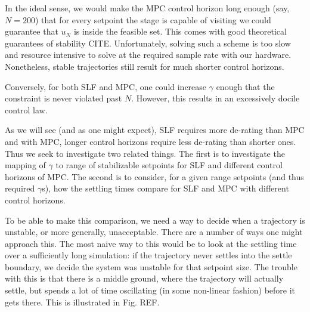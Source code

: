 \documentclass[journal,twocolumn,twoside]{IEEEtran}
\begin{document}
In the ideal sense, we would make the MPC control horizon long enough (say, $N=200$) that for every setpoint the stage is capable of visiting we could guarantee that $u_N$ is inside the feasible set. This comes with good theoretical guarantees of stability CITE. Unfortunately, solving such a scheme is too slow and resource intensive to solve at the required sample rate with our hardware. Nonetheless, stable trajectories still result for much shorter control horizons. 

Conversely, for both SLF and MPC, one could increase $\gamma$ enough that the constraint is never violated past $N$. However, this results in an excessively docile control law.

As we will see (and as one might expect), SLF requires more de-rating than MPC and with MPC, longer control horizons require less de-rating than shorter ones. Thus we seek to investigate two related things. The first is to investigate the mapping of $\gamma$ to range of stabilizable setpoints for SLF and different control horizons of MPC. The second is to consider, for a given range setpoints (and thus required $\gamma$s), how the settling times compare for SLF and MPC with different control horizons.

To be able to make this comparison, we need a way to decide when a trajectory is unstable, or more generally, unacceptable. There are a number of ways one might approach this. The most naive way to this would be to look at the settling time over a sufficiently long simulation: if the trajectory never settles into the settle boundary, we decide the system was unstable for that setpoint size. The trouble with this is that there is a middle ground, where the trajectory will actually settle, but spends a lot of time oscillating (in some non-linear fashion) before it gets there. This is illustrated in Fig. REF. 

 
\end{document}
